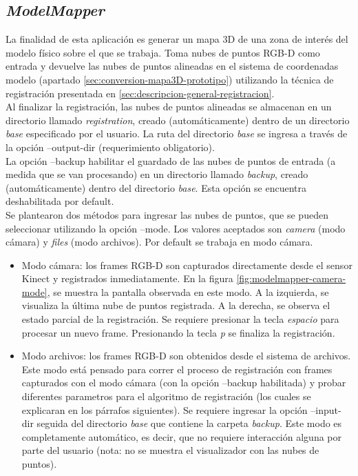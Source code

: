\subsection{\textit{ModelMapper}}
\label{sec:model-mapper}
La finalidad de esta aplicación es generar un mapa 3D de una zona de interés del modelo físico sobre el que se trabaja. Toma nubes de puntos RGB-D como entrada y devuelve las nubes de puntos alineadas en el sistema de coordenadas modelo (apartado \ref{sec:conversion-mapa3D-prototipo}) utilizando la técnica de registración presentada en \ref{sec:descripcion-general-registracion}. \\
Al finalizar la registración, las nubes de puntos alineadas se almacenan en un directorio llamado \textit{registration}, creado (automáticamente) dentro de un directorio \textit{base} especificado por el usuario. La ruta del directorio \textit{base} se ingresa a través de la opción --output-dir (requerimiento obligatorio). \\
La opción --backup habilitar el guardado de las nubes de puntos de entrada (a medida que se van procesando) en un directorio llamado \textit{backup}, creado (automáticamente) dentro del directorio \textit{base}. Esta opción se encuentra deshabilitada por default.\\
Se plantearon dos métodos para ingresar las nubes de puntos, que se pueden seleccionar utilizando la opción --mode.
Los valores aceptados son \textsl{camera} (modo cámara) y \textsl{files} (modo archivos). Por default se trabaja en modo cámara.
\begin{itemize}

\item Modo cámara: los frames RGB-D son capturados directamente desde el sensor Kinect y registrados inmediatamente. En la figura \ref{fig:modelmapper-camera-mode}, se muestra la pantalla observada en este modo. A la izquierda, se visualiza la última nube de puntos registrada. A la derecha, se observa el estado parcial de la registración. Se requiere presionar la tecla \textit{espacio} para procesar un nuevo frame. Presionando la tecla \textit{p} se finaliza la registración.

\item Modo archivos: los frames RGB-D son obtenidos desde el sistema de archivos. Este modo está pensado para correr el proceso de registración con frames capturados con el modo cámara (con la opción --backup habilitada) y probar diferentes parametros para el algoritmo de registración (los cuales se explicaran en los párrafos siguientes). Se requiere ingresar la opción --input-dir seguida del directorio \textit{base} que contiene la carpeta \textit{backup}. Este modo es completamente automático, es decir, que no requiere interacción alguna por parte del usuario (nota: no se muestra el visualizador con las nubes de puntos).

\end{itemize}

